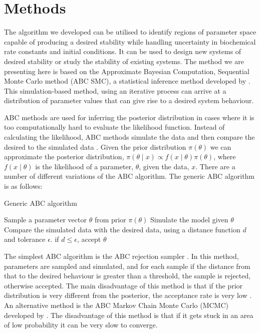 \section{Methods}

The algorithm we developed can be utilised to identify regions of parameter space capable of producing a desired stability while handling uncertainty in biochemical rate constants and initial conditions. It can be used to design new systems of desired stability or study the stability of existing systems. The method we are presenting here is based on the Approximate Bayesian Computation, Sequential Monte Carlo method (ABC SMC), a statistical inference method developed by \textcite{Toni:2009tr}. This simulation-based method, using an iterative process can arrive at a distribution of parameter values that can give rise to a desired system behaviour. 

ABC methods are used for inferring the posterior distribution in cases where it is too computationally hard to evaluate the likelihood function. Instead of calculating the likelihood, ABC methods simulate the data and then compare the desired to the simulated data \autocite{Toni:2009tr}. Given the prior distribution $\pi(\theta)$ we can approximate the posterior distribution, $\pi(\theta\mid x)\propto f(x\mid\theta)\pi(\theta)$, where $f(x\mid\theta)$ is the likelihood of a parameter, $\theta$, given the data, $x$. There are a number of different variations of the ABC algorithm. The generic ABC algorithm is as follows:
	
	\begin{algorithm}[h]
	\label{alg:ABC}
  \caption{Generic ABC algorithm}
 \begin{algorithmic}[1]
    \Statex
	\State Sample a parameter vector $\theta$ from prior $\pi(\theta)$
	\State Simulate the model given $\theta$
    \State Compare the simulated data with the desired data, using a distance function $d$ and tolerance $\epsilon$. if $d \leq \epsilon$, accept $\theta$ 
   
  \end{algorithmic}
\end{algorithm}


The simplest ABC algorithm is the ABC rejection sampler \autocite{Pritchard:1999td}. In this method, parameters are sampled and simulated, and for each sample if the distance from that to the desired behaviour is greater than a threshold, the sample is rejected, otherwise accepted. The main disadvantage of this method is that if the prior distribution is very different from the posterior, the acceptance rate is very low \autocite{Toni:2009tr}. An alternative method is the ABC Markov Chain Monte Carlo (MCMC) developed by \textcite{Marjoram:2003up}. The disadvantage of this method is that if it gets stuck in an area of low probability it can be very slow to converge.

